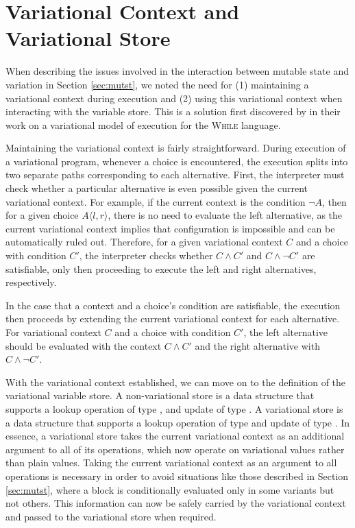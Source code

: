\documentclass[12pt,oneside]{book}
\newcommand{\tagtree}[3]{#1 \langle #2, #3 \rangle}
\begin{document}
\section{Variational Context and Variational Store}

When describing the issues involved in the interaction between mutable state and variation in Section \ref{sec:mutst}, we noted the need for (1) maintaining a variational context
during execution and (2) using this variational context when interacting with the variable store. This is a solution first discovered by \cite{varwhile} in their work on a
variational model of execution for the \textsc{While} language.

Maintaining the variational context is fairly straightforward. During execution of a variational program, whenever a choice is encountered, the execution splits into
two separate paths corresponding to each alternative. First, the interpreter must check whether a particular alternative is even possible given the current variational
context. For example, if the current context is the condition $\neg A$, then for a given choice $\tagtree{A}{l}{r}$, there is no need to evaluate the left alternative, as the current
variational context implies that
configuration is impossible and can be automatically ruled out. Therefore, for a given variational context $C$ and a choice with condition $C'$, the interpreter checks
whether $C \wedge C'$ and $C \wedge \neg C'$ are satisfiable, only then proceeding to execute the left and right alternatives, respectively.

In the case that a context and a choice's condition are satisfiable, the execution then proceeds by extending the current variational context for each alternative.
For variational context $C$ and a choice with condition $C'$, the left alternative should be evaluated with the context $C \wedge C'$ and the right alternative with
$C \wedge \neg C'$.

With the variational context established, we can move on to the definition of the variational variable store. A non-variational store is a data structure
that supports a lookup operation of type , and update of type .
A variational store is a data structure that supports a lookup operation of type  and update of type
. In essence, a variational store takes the current variational context as an
additional argument to all of its operations, which now operate on variational values rather than plain values. Taking the current variational context as an argument to all
operations is necessary in order to avoid situations like those described in Section \ref{sec:mutst}, where a block is conditionally
evaluated only in some variants but not others. This information can now be safely carried by the variational context and passed
to the variational store when required.
\end{document}
